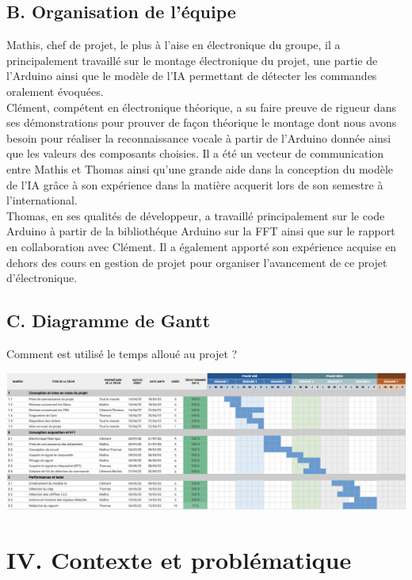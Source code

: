 \documentclass[a4paper,11pt]{book}
\begin{document}
\subsection*{B. Organisation de l'équipe}
Mathis, chef de projet, le plus à l'aise en électronique du groupe, il a principalement travaillé sur le montage électronique du projet, une partie de l'Arduino ainsi que le modèle de l'IA permettant de détecter les commandes oralement évoquées. \\

Clément, compétent en électronique théorique, a su faire preuve de rigueur dans ses démonstrations pour prouver de façon théorique le montage dont nous avons besoin pour réaliser la reconnaissance vocale à partir de l'Arduino donnée ainsi que les valeurs des composants choisies. Il a été un vecteur de communication entre Mathis et Thomas ainsi qu'une grande aide dans la conception du modèle de l'IA grâce à son expérience dans la matière acquerit lors de son semestre à l'international. \\


Thomas, en ses qualités de développeur, a travaillé principalement sur le code Arduino à partir de la bibliothéque Arduino sur la FFT ainsi que sur le rapport en collaboration avec Clément. Il a également apporté son expérience acquise en dehors des cours en gestion de projet pour organiser l'avancement de ce projet d'électronique. \\

\subsection*{C. Diagramme de Gantt}
Comment est utilisé le temps alloué au projet ? 

\includegraphics[width=\textwidth]{Diagramme de gantt.png}

\newpage
\section*{IV. Contexte et problématique}
\end{document}
